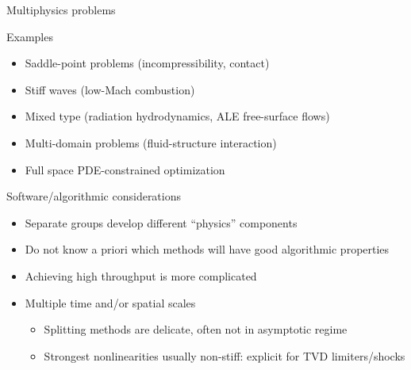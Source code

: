 \begin{frame}{Multiphysics problems}
  \begin{block}{Examples}
    \begin{itemize}
    \item Saddle-point problems (\eg incompressibility, contact)
    \item Stiff waves (\eg low-Mach combustion)
    \item Mixed type (\eg radiation hydrodynamics, ALE free-surface flows)
    \item Multi-domain problems (\eg fluid-structure interaction)
    \item Full space PDE-constrained optimization
    \end{itemize}
  \end{block}
  \vspace{-0.5em}
  \begin{block}{Software/algorithmic considerations}
    \begin{itemize}
    \item Separate groups develop different ``physics'' components
    \item Do not know a priori which methods will have good algorithmic properties
    \item Achieving high throughput is more complicated
    \item Multiple time and/or spatial scales
      \begin{itemize}
      \item Splitting methods are delicate, often not in asymptotic regime
      \item Strongest nonlinearities usually non-stiff: explicit for TVD limiters/shocks
      \end{itemize}
    \end{itemize}
  \end{block}
\end{frame}

